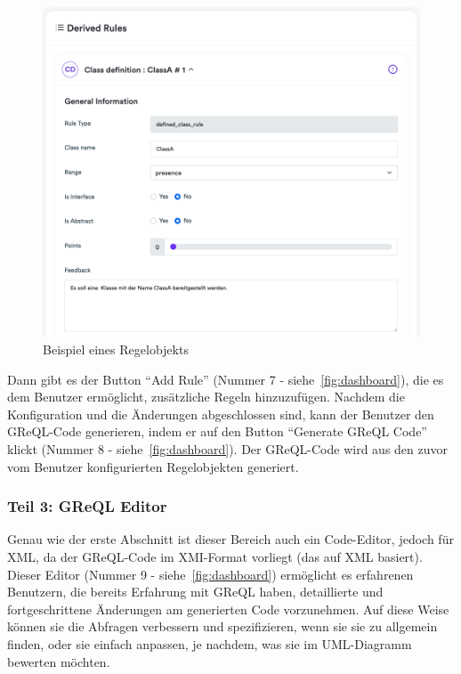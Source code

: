 \begin{figure}[h]
    \centering
    \includegraphics[width=16cm]{images/derived_rule}
    \caption{Beispiel eines Regelobjekts}
    \label{fig:rule_exemple}
\end{figure}

Dann gibt es der Button ``Add Rule'' (Nummer 7 - siehe~\ref{fig:dashboard}), die es dem Benutzer ermöglicht,
zusätzliche Regeln hinzuzufügen. Nachdem die Konfiguration und die Änderungen abgeschlossen sind, kann der Benutzer den
GReQL-Code generieren, indem er auf den Button ``Generate GReQL Code'' klickt (Nummer 8 - siehe~\ref{fig:dashboard}).
Der GReQL-Code wird aus den zuvor vom Benutzer konfigurierten Regelobjekten generiert.

\subsubsection{Teil 3: GReQL Editor}

Genau wie der erste Abschnitt ist dieser Bereich auch ein Code-Editor, jedoch für XML, da der GReQL-Code im XMI-Format
vorliegt (das auf XML basiert). Dieser Editor (Nummer 9 - siehe~\ref{fig:dashboard}) ermöglicht es erfahrenen
Benutzern, die bereits Erfahrung mit GReQL haben, detaillierte und fortgeschrittene Änderungen am generierten Code
vorzunehmen. Auf diese Weise können sie die Abfragen verbessern und spezifizieren, wenn sie sie zu allgemein finden,
oder sie einfach anpassen, je nachdem, was sie im UML-Diagramm bewerten möchten.

